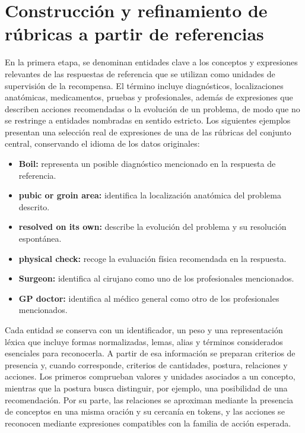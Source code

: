 \section{Construcción y refinamiento de rúbricas a partir de referencias}
\label{sec:metodo-criterios}
En la primera etapa, se denominan entidades clave a los conceptos y expresiones relevantes de las respuestas de referencia que se utilizan como unidades de supervisión de la recompensa. El término incluye diagnósticos, localizaciones anatómicas, medicamentos, pruebas y profesionales, además de expresiones que describen acciones recomendadas o la evolución de un problema, de modo que no se restringe a entidades nombradas en sentido estricto. Los siguientes ejemplos presentan una selección real de expresiones de una de las rúbricas del conjunto central, conservando el idioma de los datos originales:

\begingroup
\begin{itemize}
\item \textbf{Boil:} representa un posible diagnóstico mencionado en la respuesta de referencia.
\item \textbf{pubic or groin area:} identifica la localización anatómica del problema descrito.
\item \textbf{resolved on its own:} describe la evolución del problema y su resolución espontánea.
\item \textbf{physical check:} recoge la evaluación física recomendada en la respuesta.
\item \textbf{Surgeon:} identifica al cirujano como uno de los profesionales mencionados.
\item \textbf{GP doctor:} identifica al médico general como otro de los profesionales mencionados.
\end{itemize}
\endgroup

Cada entidad se conserva con un identificador, un peso y una representación léxica que incluye formas normalizadas, lemas, alias y términos considerados esenciales para reconocerla. A partir de esa información se preparan criterios de presencia y, cuando corresponde, criterios de cantidades, postura, relaciones y acciones. Los primeros comprueban valores y unidades asociados a un concepto, mientras que la postura busca distinguir, por ejemplo, una posibilidad de una recomendación. Por su parte, las relaciones se aproximan mediante la presencia de conceptos en una misma oración y su cercanía en tokens, y las acciones se reconocen mediante expresiones compatibles con la familia de acción esperada.


